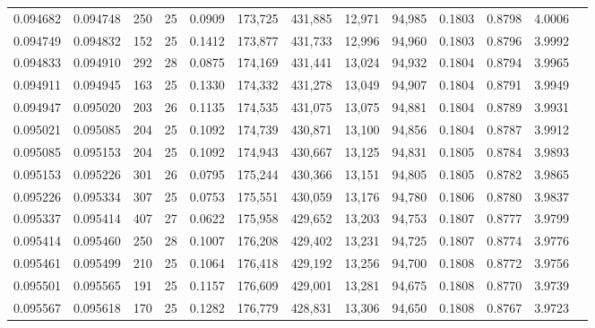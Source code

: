 \begin{tabular}{rrrrrrrrrrrrr}
0.094682 & 0.094748 & 250 &  25 &                                     0.0909 & 173,725 & 431,885 &  12,971 &  94,985 & 0.1803 & 0.8798 & 4.0006 \\
0.094749 & 0.094832 & 152 &  25 &                                     0.1412 & 173,877 & 431,733 &  12,996 &  94,960 & 0.1803 & 0.8796 & 3.9992 \\
0.094833 & 0.094910 & 292 &  28 &                                     0.0875 & 174,169 & 431,441 &  13,024 &  94,932 & 0.1804 & 0.8794 & 3.9965 \\
0.094911 & 0.094945 & 163 &  25 &                                     0.1330 & 174,332 & 431,278 &  13,049 &  94,907 & 0.1804 & 0.8791 & 3.9949 \\
0.094947 & 0.095020 & 203 &  26 &                                     0.1135 & 174,535 & 431,075 &  13,075 &  94,881 & 0.1804 & 0.8789 & 3.9931 \\
0.095021 & 0.095085 & 204 &  25 &                                     0.1092 & 174,739 & 430,871 &  13,100 &  94,856 & 0.1804 & 0.8787 & 3.9912 \\
0.095085 & 0.095153 & 204 &  25 &                                     0.1092 & 174,943 & 430,667 &  13,125 &  94,831 & 0.1805 & 0.8784 & 3.9893 \\
0.095153 & 0.095226 & 301 &  26 &                                     0.0795 & 175,244 & 430,366 &  13,151 &  94,805 & 0.1805 & 0.8782 & 3.9865 \\
0.095226 & 0.095334 & 307 &  25 &                                     0.0753 & 175,551 & 430,059 &  13,176 &  94,780 & 0.1806 & 0.8780 & 3.9837 \\
0.095337 & 0.095414 & 407 &  27 &                                     0.0622 & 175,958 & 429,652 &  13,203 &  94,753 & 0.1807 & 0.8777 & 3.9799 \\
0.095414 & 0.095460 & 250 &  28 &                                     0.1007 & 176,208 & 429,402 &  13,231 &  94,725 & 0.1807 & 0.8774 & 3.9776 \\
0.095461 & 0.095499 & 210 &  25 &                                     0.1064 & 176,418 & 429,192 &  13,256 &  94,700 & 0.1808 & 0.8772 & 3.9756 \\
0.095501 & 0.095565 & 191 &  25 &                                     0.1157 & 176,609 & 429,001 &  13,281 &  94,675 & 0.1808 & 0.8770 & 3.9739 \\
0.095567 & 0.095618 & 170 &  25 &                                     0.1282 & 176,779 & 428,831 &  13,306 &  94,650 & 0.1808 & 0.8767 & 3.9723 \\

\end{tabular}
